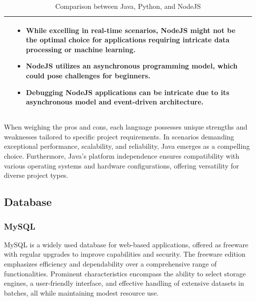 \begin{table}[H]
\begin{tabular}{| c | p{} | p{} |}
                    &   \begin{itemize}[leftmargin=*,topsep=0pt,partopsep=0pt,parsep=0pt]
                            \item While excelling in real-time scenarios, NodeJS might not be the optimal choice for applications requiring intricate data processing or machine learning.
                            \item NodeJS utilizes an asynchronous programming model, which could pose challenges for beginners.
                            \item Debugging NodeJS applications can be intricate due to its asynchronous model and event-driven architecture.
                    \end{itemize} \\ \hline
    \end{tabular}
    \caption{Comparison between Java, Python, and NodeJS}
\end{table}

When weighing the pros and cons, each language possesses unique strengths and weaknesses tailored to specific project requirements. In scenarios demanding exceptional performance, scalability, and reliability, Java emerges as a compelling choice. Furthermore, Java's platform independence ensures compatibility with various operating systems and hardware configurations, offering versatility for diverse project types.

\subsection{Database}

\subsubsection{MySQL}

MySQL is a widely used database for web-based applications, offered as freeware with regular upgrades to improve capabilities and security. The freeware edition emphasizes efficiency and dependability over a comprehensive range of functionalities. Prominent characteristics encompass the ability to select storage engines, a user-friendly interface, and effective handling of extensive datasets in batches, all while maintaining modest resource use.

